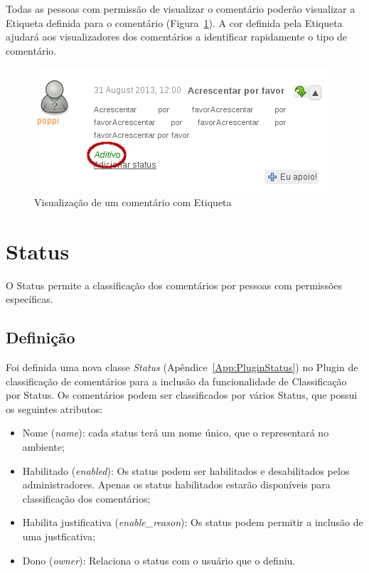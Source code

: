 \documentclass[11pt]{article}
\begin{document}
Todas as pessoas com permissão de visualizar o comentário poderão
visualizar a Etiqueta definida para o comentário
(Figura~\ref{fig:comment-view-label}). A cor definida pela Etiqueta
ajudará aos visualizadores dos comentários a identificar rapidamente o
tipo de comentário.

\begin{figure}[h]
\center
\includegraphics[scale=0.6]{comment-view-label.png}
\caption{Visualização de um comentário com Etiqueta}
\label{fig:comment-view-label}
\end{figure}

\section{Status}

O Status permite a classificação dos comentários por pessoas com
permissões específicas.


\subsection{Definição}

Foi definida uma nova classe {\it Status}
(Apêndice~\ref{App:PluginStatus}) no Plugin de classificação de
comentários para a inclusão da funcionalidade de Classificação por
Status. Os comentários podem ser classificados por vários Status, que possui os
seguintes atributos:
\begin{itemize}
  \item Nome ({\it name}): cada status terá um nome único, que o representará no
ambiente;
  \item Habilitado ({\it enabled}): Os status podem ser habilitados e
desabilitados pelos administradores. Apenas os status habilitados estarão
disponíveis para classificação dos comentários;
  \item Habilita justificativa ({\it enable\_reason}): Os status podem
permitir a inclusão de uma justficativa;
 \item Dono ({\it owner}): Relaciona o status com o usuário que o
definiu. 
\end{itemize}
\end{document}
